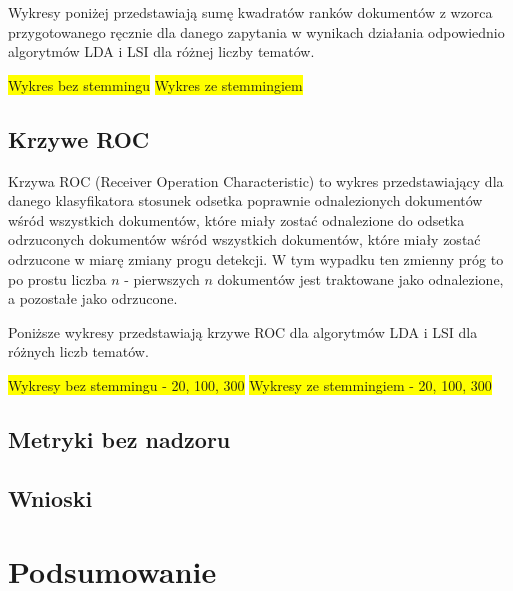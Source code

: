 \documentclass[11pt,a4paper]{article}
\newcommand{\todo}[1]{\colorbox{yellow}{#1}}
\begin{document}
Wykresy poniżej przedstawiają sumę kwadratów ranków dokumentów z wzorca przygotowanego
ręcznie dla danego zapytania w wynikach działania odpowiednio algorytmów LDA i LSI
dla różnej liczby tematów.

\todo{Wykres bez stemmingu}
\todo{Wykres ze stemmingiem}

\subsection{Krzywe ROC}

Krzywa ROC (Receiver Operation Characteristic) to wykres przedstawiający dla
danego klasyfikatora stosunek odsetka poprawnie odnalezionych dokumentów wśród
wszystkich dokumentów, które miały zostać odnalezione do odsetka odrzuconych
dokumentów wśród wszystkich dokumentów, które miały zostać odrzucone w miarę
zmiany progu detekcji. W tym wypadku ten zmienny próg to po prostu liczba $n$ -
pierwszych $n$ dokumentów jest traktowane jako odnalezione, a pozostałe jako
odrzucone.

Poniższe wykresy przedstawiają krzywe ROC dla algorytmów LDA i LSI dla różnych
liczb tematów.

\todo{Wykresy bez stemmingu - 20, 100, 300}
\todo{Wykresy ze stemmingiem - 20, 100, 300}

\subsection{Metryki bez nadzoru}

\subsection{Wnioski}

\section{Podsumowanie}

\enddocument
\end{document}
